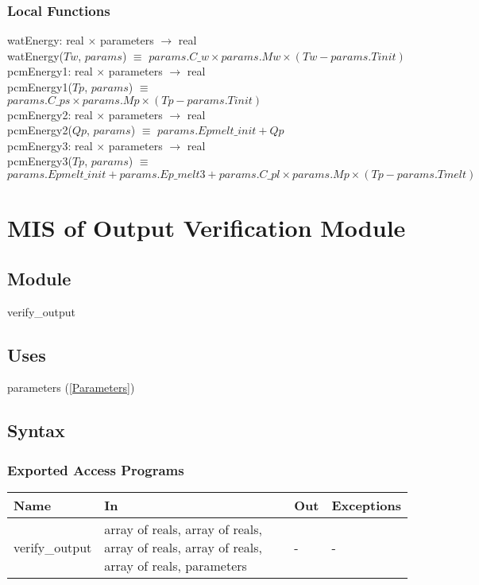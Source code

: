 \documentclass[12pt]{article}
\begin{document}
\subsubsection{Local Functions}
watEnergy: real $\times$ parameters $\rightarrow$ real \\
watEnergy($Tw$, $params$) $\equiv$ $params.C\_w \times params.Mw \times (Tw - params.Tinit)$ \\
\newline
pcmEnergy1: real $\times$ parameters $\rightarrow$ real \\
pcmEnergy1($Tp$, $params$) $\equiv$ $params.C\_ps \times params.Mp \times (Tp - params.Tinit)$ \\
\newline
pcmEnergy2: real $\times$ parameters $\rightarrow$ real \\
pcmEnergy2($Qp$, $params$) $\equiv$ $params.Epmelt\_init + Qp$ \\
\newline
pcmEnergy3: real $\times$ parameters $\rightarrow$ real \\
pcmEnergy3($Tp$, $params$) $\equiv$ $params.Epmelt\_init + params.Ep\_melt3 + params.C\_pl \times params.Mp \times (Tp - params.Tmelt)$ \\

\section{MIS of Output Verification Module} \label{VerifyOutput}
\subsection{Module}
verify\_output
\subsection{Uses}
parameters (\ref{Parameters})
\subsection{Syntax}
\subsubsection{Exported Access Programs}
\begin{center}
\begin{tabular}{p{3cm} p{7cm} p{2cm} p{2cm}}
\hline
\textbf{Name} & \textbf{In} & \textbf{Out} & \textbf{Exceptions} \\
\hline
verify\_output & array of reals, array of reals, array of reals, array of reals, array of reals, parameters & - & - \\
\hline
\end{tabular}
\end{center}
\end{document}
